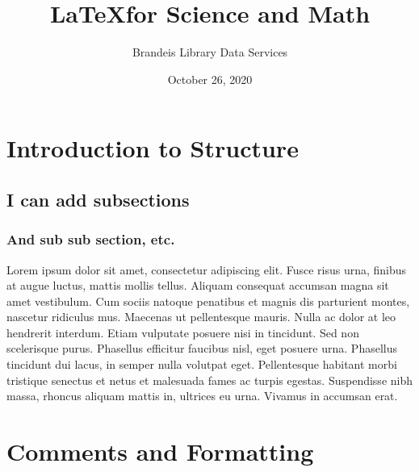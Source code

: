 \documentclass{article}
\title{\LaTeX for Science and Math}
\author{Brandeis Library Data Services }
\date{October 26, 2020}
\begin{document}


\maketitle

\tableofcontents

\pagebreak

\section{Introduction to Structure}
\subsection{I can add subsections}
\subsubsection{And sub sub section, etc.}

Lorem ipsum dolor sit amet, consectetur adipiscing elit. Fusce risus 
urna, finibus at augue luctus, mattis mollis tellus. Aliquam consequat 
accumsan magna sit amet vestibulum. Cum sociis natoque penatibus et 
magnis dis parturient montes, nascetur ridiculus mus. Maecenas ut 
pellentesque mauris. Nulla ac dolor at leo hendrerit interdum. Etiam 
vulputate posuere nisi in tincidunt. Sed non scelerisque purus. Phasellus 
efficitur faucibus nisl, eget posuere urna. Phasellus tincidunt dui 
lacus, in semper nulla volutpat eget. Pellentesque habitant morbi 
tristique senectus et netus et malesuada fames ac turpis egestas. 
Suspendisse nibh massa, rhoncus aliquam mattis in, ultrices eu urna. 
Vivamus in accumsan erat.

\section{Comments and Formatting}

\end{document}
